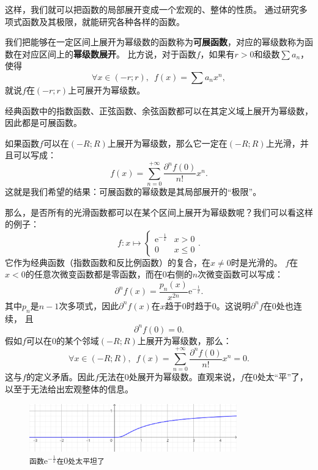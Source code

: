 \documentclass[12pt,UTF8]{ctexbook}
\theoremstyle{definition}
\theoremstyle{plain}
\newtheorem{sk}{思考}[section]
\begin{document}
这样，我们就可以把函数的局部展开变成一个宏观的、整体的性质。
通过研究多项式函数及其极限，就能研究各种各样的函数。

我们把能够在一定区间上展开为幂级数的函数称为\textbf{可展函数}，对应的幂级数称为函数在对应区间上的\textbf{幂级数展开}。
比方说，对于函数$f$，如果有$r>0$和级数$\sum a_n$，使得
$$\forall x\in (-r;r),\,\,\, f(x) = \sum a_n x^n,$$
就说$f$在$(-r;r)$上可展开为幂级数。

经典函数中的指数函数、正弦函数、余弦函数都可以在其定义域上展开为幂级数，因此都是可展函数。

如果函数$f$可以在$(-R;R)$上展开为幂级数，那么它一定在$(-R;R)$上光滑，并且可以写成：
$$ f(x) = \sum_{n=0}^{+\infty} \frac{\partial^n f(0)}{n!} x^n. $$
这就是我们希望的结果：可展函数的幂级数是其局部展开的“极限”。

那么，是否所有的光滑函数都可以在某个区间上展开为幂级数呢？我们可以看这样的例子：
$$ f: x\mapsto \begin{cases} \mathrm{e}^{-\frac{1}{x}} & x > 0 \\ 0 & x \leqslant 0 \end{cases}.$$
它作为经典函数（指数函数和反比例函数）的复合，在$x\neq 0$时是光滑的。
$f$在$x<0$的任意次微变函数都是零函数，而在$0$右侧的$n$次微变函数可以写成：
$$ \partial^n f(x) = \frac{p_n(x)}{x^{2n}} \mathrm{e}^{-\frac{1}{x}}.$$
其中$p_n$是$n-1$次多项式，因此$\partial^n f(x)$在$x$趋于$0$时趋于$0$。这说明$\partial^n f$在$0$处也连续，
且
$$ \partial^n f(0) = 0.$$
假如$f$可以在$0$的某个邻域$(-R;R)$上展开为幂级数，那么：
$$ \forall x \in (-R;R) ,\,\,\, f(x) = \sum_{n=0}^{+\infty} \frac{\partial^n f(0)}{n!} x^n = 0. $$
这与$f$的定义矛盾。因此$f$无法在$0$处展开为幂级数。直观来说，$f$在$0$处太“平”了，以至于无法给出宏观整体的信息。

\begin{figure}[h] %
    \centering
    \includegraphics[width=0.8\textwidth]{tu/幂级数2.png}
    \caption*{\texttt{函数}$\displaystyle \mathrm{e}^{-\frac{1}{x}}$\texttt{在}$0$\texttt{处太平坦了}}
\end{figure}

\end{document}
